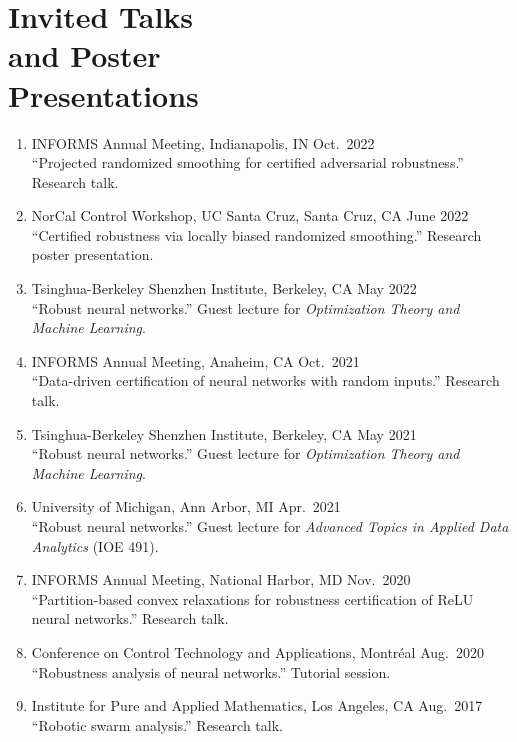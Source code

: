 \documentclass[11pt]{article}
\newcommand{\cvdate}[1]{\hfill#1}			%
\begin{document}
	\nocite{*}
	
	
	\section{\texorpdfstring{Invited Talks \\[\baselineskip] and Poster \\ Presentations}{Invited Talks and Poster Presentations}}
	\hfill\vspace*{-3\baselineskip}
	\begin{enumerate}[label={\arabic*.}]
		\item INFORMS Annual Meeting, Indianapolis, IN \cvdate{Oct.\ 2022}\\
		``Projected randomized smoothing for certified adversarial robustness.'' Research talk.
		\item NorCal Control Workshop, UC Santa Cruz, Santa Cruz, CA \cvdate{June 2022}\\
		``Certified robustness via locally biased randomized smoothing.'' Research poster presentation.
		\item Tsinghua-Berkeley Shenzhen Institute, Berkeley, CA \cvdate{May 2022}\\
		``Robust neural networks.'' Guest lecture for \textit{Optimization Theory and Machine Learning}.
		\item INFORMS Annual Meeting, Anaheim, CA \cvdate{Oct.\ 2021}\\
		``Data-driven certification of neural networks with random inputs.'' Research talk.
		\item Tsinghua-Berkeley Shenzhen Institute, Berkeley, CA \cvdate{May 2021}\\
		``Robust neural networks.'' Guest lecture for \textit{Optimization Theory and Machine Learning}.
		\item University of Michigan, Ann Arbor, MI \cvdate{Apr.\ 2021}\\
		``Robust neural networks.'' Guest lecture for \textit{Advanced Topics in Applied Data Analytics} (IOE 491).
		\item INFORMS Annual Meeting, National Harbor, MD \cvdate{Nov.\ 2020}\\
		``Partition-based convex relaxations for robustness certification of ReLU neural networks.'' Research talk.
		\item Conference on Control Technology and Applications, Montr\'eal \cvdate{Aug.\ 2020}\\
		``Robustness analysis of neural networks.'' Tutorial session.
		\item Institute for Pure and Applied Mathematics, Los Angeles, CA \cvdate{Aug.\ 2017}\\
		``Robotic swarm analysis.'' Research talk.
	\end{enumerate}
	
\end{document}
